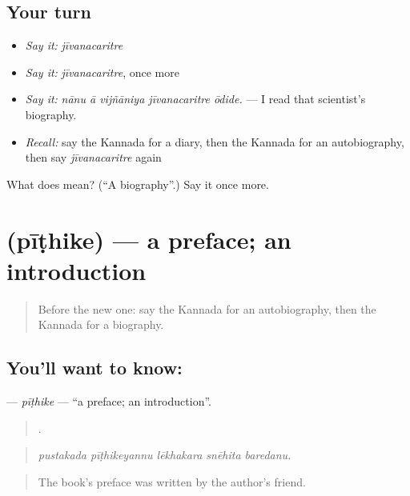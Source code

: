 \subsection*{Your turn}
\begin{itemize}
\raggedright
  \item \emph{Say it:} \emph{jīvanacaritre}
  \item \emph{Say it:} \emph{jīvanacaritre}, once more
  \item \emph{Say it:} \emph{nānu ā vijñāniya jīvanacaritre ōdide.} — I read that scientist's biography.
  \item \emph{Recall:} say the Kannada for a diary, then the Kannada for an autobiography, then say \emph{jīvanacaritre} again
\end{itemize}

\begin{tcolorbox}[breakable,colback=teal!4,colframe=teal!35!black,title={Before you move on}]
What does  mean? (\textquotedblleft{}A biography\textquotedblright{}.) Say it once more.
\end{tcolorbox}
\section[\texorpdfstring{\kn{ಪೀಠಿಕೆ} (pīṭhike)}{ಪೀಠಿಕೆ (pīṭhike)}]{ (pīṭhike) — a preface; an introduction}

\label{lesson:KA-C364-pithike}



\begin{quote}
Before the new one: say the Kannada for an autobiography, then the Kannada for a biography.
\end{quote}

\subsection*{You'll want to know: }
\textbf{} — \emph{pīṭhike} — \textquotedblleft{}a preface; an introduction\textquotedblright{}.

\begin{quote}
    .
\end{quote}

\begin{quote}
\emph{pustakada pīṭhikeyannu lēkhakara snēhita baredanu.}
\end{quote}

\begin{quote}
The book's preface was written by the author's friend.
\end{quote}

